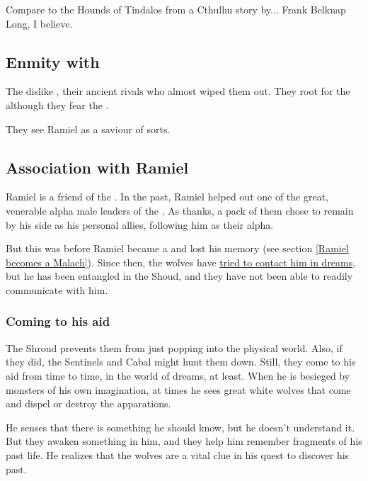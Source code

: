 Compare to the Hounds of Tindalos from a Cthulhu story by... Frank Belknap Long, I believe. 







\subsection{Enmity with \dragons}
\label{Moon-Wolves dislike Dragons}
The \moonwolves{} dislike \dragons, their ancient rivals who almost wiped them out. They root for the \resphain\dash although they fear the \banes. 

They see Ramiel as a saviour of sorts.







\subsection{Association with Ramiel}
Ramiel is a friend of the \MoonWolves{}. In the past, Ramiel helped out one of the great, venerable alpha male leaders of the \moonwolves. As thanks, a pack of them chose to remain by his side as his personal allies, following him as their alpha.

But this was before Ramiel became a \Malach{} and lost his memory (see section \ref{Ramiel becomes a Malach}). Since then, the wolves have \hyperref[Carzain dreams of Moon-Wolves]{tried to contact him in dreams}, but he has been entangled in the Shoud, and they have not been able to readily communicate with him. 





\subsubsection{Coming to his aid}
\label{Moon-Wolves help Ramiel in dreams}
The Shroud prevents them from just popping into the physical world. Also, if they did, the Sentinels and Cabal might hunt them down. Still, they come to his aid from time to time, in the world of dreams, at least. When he is besieged by monsters of his own imagination, at times he sees great white wolves that come and dispel or destroy the apparations. 

He senses that there is something he should know, but he doesn't understand it. But they awaken something in him, and they help him remember fragments of his past life. He realizes that the wolves are a vital clue in his quest to discover his past.


